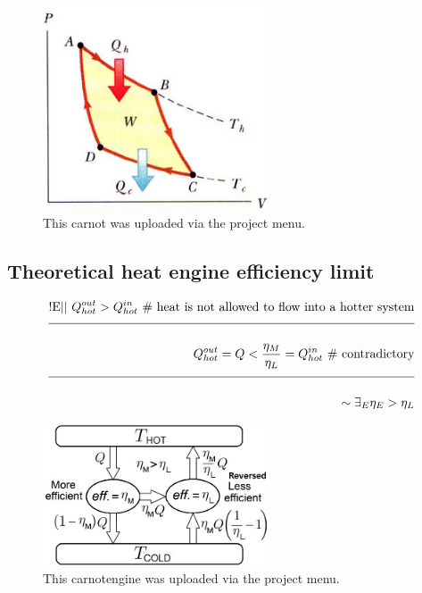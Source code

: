 \documentclass[a4paper]{article}
\newcommand{\eqComment}[1]{\text{  \# #1}}
\newcommand{\experimental}{\text{!E||  }}
\newcommand{\n}{\\[1.5ex] \hline \nonumber \\[0ex]}
\begin{document}
\begin{figure}[h]
\centering
\includegraphics[width=0.6\textwidth]{figures/carnot.jpg}
\caption{\label{fig:carnot}This carnot was uploaded via the project menu.}
\end{figure} \FloatBarrier

\subsection{Theoretical heat engine efficiency limit}
\begin{tcolorbox}
\begin{align}
   \experimental Q_{hot}^{out} > Q_{hot}^{in} \eqComment{heat is not allowed to flow into a hotter system}
\n Q_{hot}^{out} = Q < \frac{\eta_M}{\eta_L} = Q_{hot}^{in} \eqComment{contradictory}
\n \sim \exists_E \eta_E > \eta_L
\end{align}
\end{tcolorbox}

\begin{figure}[h]
\centering
\includegraphics[width=0.6\textwidth]{figures/carnotengine.jpg}
\caption{\label{fig:carnotengine}This carnotengine was uploaded via the project menu.}
\end{figure} \FloatBarrier
\end{document}
